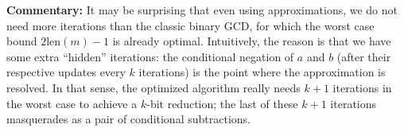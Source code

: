 \documentclass{llncs}
\newcommand{\bitlength}{\text{len}}
\begin{document}
\vspace{2ex}
\noindent\textsf{\textbf{Commentary:}} It may be surprising that even
using approximations, we do not need more iterations than the classic
binary GCD, for which the worst case bound $2\bitlength(m)-1$ is already
optimal. Intuitively, the reason is that we have some extra ``hidden''
iterations: the conditional negation of $a$ and $b$ (after their
respective updates every $k$ iterations) is the point where the
approximation is resolved. In that sense, the optimized algorithm really
needs $k+1$ iterations in the worst case to achieve a $k$-bit reduction;
the last of these $k+1$ iterations masquerades as a pair of conditional
subtractions.
\end{document}
